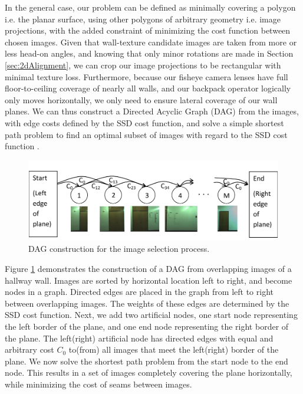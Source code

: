 \documentclass[]{spie}  %
\begin{document}
In the general case, our problem can be defined as minimally covering
a polygon i.e. the planar surface, using other polygons of arbitrary
geometry i.e. image projections, with the added constraint of
minimizing the cost function between chosen images. Given that
wall-texture candidate images are taken from more or less head-on
angles, and knowing that only minor rotations are made in Section
\ref{sec:2dAlignment}, we can crop our image projections to be
rectangular with minimal texture loss. Furthermore, because our
fisheye camera lenses have full floor-to-ceiling coverage of nearly
all walls, and our backpack operator logically only moves
horizontally, we only need to ensure lateral coverage of our wall
planes. We can thus construct a Directed Acyclic Graph (DAG) from the
images, with edge costs defined by the SSD cost function, and solve a
simple shortest path problem to find an optimal subset of images with
regard to the SSD cost function \cite{dijkstra}.

\begin{figure}
  \centering
  \includegraphics[width=5in]{dagCreation.pdf}
  \caption{DAG construction for the image selection process. \\}
  \label{fig:dagCreation}
\end{figure}

Figure \ref{fig:dagCreation} demonstrates the construction of a DAG
from overlapping images of a hallway wall. Images are sorted by
horizontal location left to right, and become nodes in a
graph. Directed edges are placed in the graph from left to right
between overlapping images. The weights of these edges are determined
by the SSD cost function. Next, we add two artificial nodes, one start
node representing the left border of the plane, and one end node
representing the right border of the plane. The left(right) artificial
node has directed edges with equal and arbitrary cost $C_0$ to(from)
all images that meet the left(right) border of the plane. We now solve
the shortest path problem from the start node to the end node. This
results in a set of images completely covering the plane horizontally,
while minimizing the cost of seams between images.
\end{document}
